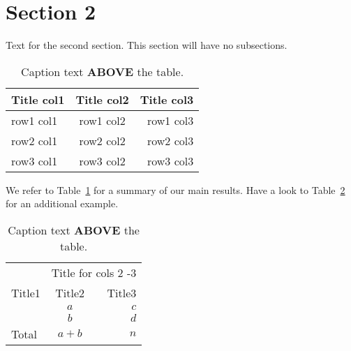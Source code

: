 \documentclass[twoside]{report}
\begin{document}
\section{Section 2}
Text for the second section. This section will have no subsections.





\begin{table}[!ht]\centering
\caption{\label{smith:tab1} Caption text \textbf{ABOVE} the table.}
\medskip
\begin{tabular}{lcr}
\toprule[0.09 em]
Title col1 & Title col2 & Title col3 \\
\midrule
row1 col1  & row1 col2  & row1 col3  \\
row2 col1  & row2 col2  & row2 col3  \\ %
row3 col1  & row3 col2  & row3 col3  \\
\bottomrule[0.09 em]
\end{tabular}
\end{table}

We refer to Table~\ref{smith:tab1} for a summary of our main results. Have a look to Table~\ref{smith:tab2} for
an additional example.

\begin{table}[!ht]\centering
\caption{\label{smith:tab2} Caption text \textbf{ABOVE} the table.}
\medskip
\begin{tabular}{lcr}
\toprule[0.09 em]
  &\multicolumn{2}{c}{Title  for cols 2 -3} \\
\cmidrule{2-3} %
Title1 & Title2 & Title3 \\
\midrule
& $a$  & $c$ \\
& $b$  & $d$ \\ %
\midrule[0 em]
Total  & $a+b$  & $n$  \\
\bottomrule[0.09 em]
\end{tabular}
\end{table}
\end{document}
